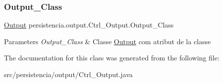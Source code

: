 \subsubsection{\texorpdfstring{Output\+\_\+\+Class}{Output\_Class}}
{\footnotesize\ttfamily \hyperlink{classpersistencia_1_1output_1_1Output}{Output} persistencia.\+output.\+Ctrl\+\_\+\+Output.\+Output\+\_\+\+Class\hspace{0.3cm}{\ttfamily [package]}}


\begin{DoxyParams}{Parameters}
{\em Output\+\_\+\+Class} & Classe \hyperlink{classpersistencia_1_1output_1_1Output}{Output} com atribut de la classe \\
\hline
\end{DoxyParams}


The documentation for this class was generated from the following file\+:\begin{DoxyCompactItemize}
\item 
src/persistencia/output/Ctrl\+\_\+\+Output.\+java\end{DoxyCompactItemize}
